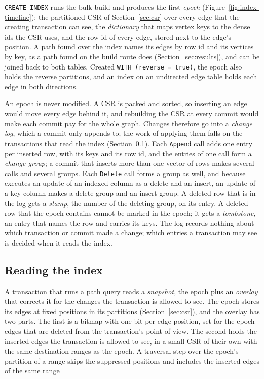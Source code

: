 \texttt{CREATE INDEX} runs the bulk build and produces the first \emph{epoch} (Figure~\ref{fig:index-timeline}): the
partitioned CSR of Section~\ref{sec:csr} over every edge that the creating transaction can see, the \emph{dictionary}
that maps vertex keys to the dense ids the CSR uses, and the row id of every edge, stored next to the edge's position.
A path found over the index names its edges by row id and its vertices by key, as a path found on the build
route does (Section~\ref{sec:results}), and can be joined back to both tables.
Created \texttt{WITH (reverse = true)}, the epoch also holds the reverse partitions, and an index on an undirected edge
table holds each edge in both directions.

An epoch is never modified. A CSR is packed and sorted, so inserting an edge would move every edge behind it, and
rebuilding the CSR at every commit would make each commit pay for the whole graph. Changes therefore go into a
\emph{change log}, which a commit only appends to; the work of applying them falls on the transactions that read the
index (Section~\ref{sec:index-read}). Each \texttt{Append} call adds one entry per inserted row, with its keys and
its row id, and the entries of one call form a \emph{change group}; a commit that inserts more than one vector of rows
makes several calls and several groups. Each \texttt{Delete} call forms a group as well, and because \duckdb
executes an update of an indexed column as a delete and an insert, an update of a key column makes a delete group and
an insert group. A deleted row that
is in the log gets a \emph{stamp}, the number of the deleting group, on its entry. A deleted row that the epoch
contains cannot be marked in the epoch; it gets a \emph{tombstone}, an entry that names the row and carries its
keys. The log records nothing about which transaction or commit made a change; which entries a transaction may see is
decided when it reads the index.

\subsection{Reading the index}
\label{sec:index-read}

A transaction that runs a path query reads a \emph{snapshot}, the epoch plus an \emph{overlay} that corrects it for
the changes the transaction is allowed to see. The epoch stores its edges at fixed positions in its partitions
(Section~\ref{sec:csr}), and the overlay has two parts. The first is a bitmap with one bit per edge position, set
for the epoch edges that are deleted from the transaction's point of view. The second holds the inserted edges the
transaction is allowed to see, in a small CSR of their own with the same destination ranges as the epoch. A traversal step over the epoch's partition of a range skips the suppressed positions and includes the inserted
edges of the same range 

